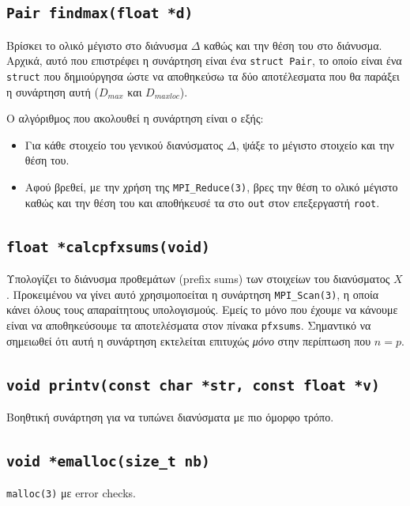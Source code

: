 \documentclass{article}
\begin{document}
\subsection{\lstinline{Pair findmax(float *d)}}

Βρίσκει το ολικό μέγιστο στο διάνυσμα $Δ$ καθώς και την θέση του στο διάνυσμα.
Αρχικά, αυτό που επιστρέφει η συνάρτηση είναι ένα \lstinline{struct Pair}, το
οποίο είναι ένα \lstinline{struct} που δημιούργησα ώστε να αποθηκεύσω τα δύο
αποτέλεσματα που θα παράξει η συνάρτηση αυτή ($D_{max}$ και $D_{maxloc}$).

Ο αλγόριθμος που ακολουθεί η συνάρτηση είναι ο εξής:
\begin{itemize}
        \item Για κάθε στοιχείο του γενικού διανύσματος $Δ$, ψάξε
        το μέγιστο στοιχείο και την θέση του.
        \item Αφού βρεθεί, με την χρήση της \lstinline{MPI_Reduce(3)},
        βρες την θέση το ολικό μέγιστο καθώς και την θέση του και αποθήκευσέ
        τα στο \lstinline{out} στον επεξεργαστή \lstinline{root}.
\end{itemize}

\subsection{\lstinline{float *calcpfxsums(void)}}

Υπολογίζει το διάνυσμα προθεμάτων (prefix sums) των στοιχείων του
διανύσματος $X$. Προκειμένου να γίνει αυτό χρησιμοποείται η συνάρτηση
\lstinline{MPI_Scan(3)}, η οποία κάνει όλους τους απαραίτητους υπολογισμούς.
Εμείς το μόνο που έχουμε να κάνουμε είναι να αποθηκεύσουμε τα αποτελέσματα στον
πίνακα \lstinline{pfxsums}. Σημαντικό να σημειωθεί ότι αυτή η συνάρτηση
εκτελείται επιτυχώς \textit{μόνο} στην περίπτωση που $n = p$. 

\subsection{\lstinline{void printv(const char *str, const float *v)}}

Βοηθτική συνάρτηση για να τυπώνει διανύσματα με πιο όμορφο τρόπο.

\subsection{\lstinline{void *emalloc(size_t nb)}}

\lstinline{malloc(3)} με error checks.
\end{document}
